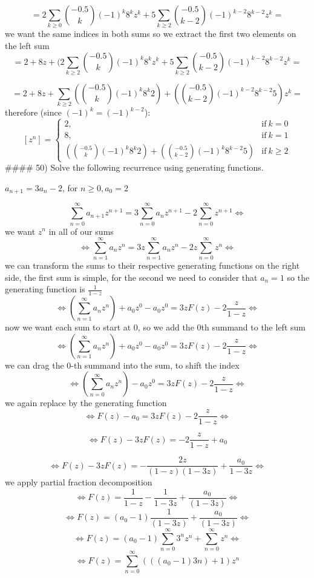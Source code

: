 \documentclass[
]{article}
\begin{document}
\[
= 2 \sum_{k\geq 0} \binom{-0.5}{k} (-1)^k 8^k z^k + 5 \sum_{k\geq 2} \binom{-0.5}{k-2} (-1)^{k-2} 8^{k-2} z^{k} =
\] we want the same indices in both sums so we extract the first two
elements on the left sum \[
= 2 + 8z + (2 \sum_{k\geq 2} \binom{-0.5}{k} (-1)^k 8^k z^k + 5 \sum_{k\geq 2} \binom{-0.5}{k-2} (-1)^{k-2} 8^{k-2} z^{k}  =
\]

\[
= 2 + 8z + \sum_{k\geq 2} \left(\binom{-0.5}{k} (-1)^k 8^k 2 \right) + \left( \binom{-0.5}{k-2} (-1)^{k-2} 8^{k-2} 5 \right) z^{k}  =
\] therefore (since \((-1)^k = (-1)^{k-2}\)): \[
[z^n]= \begin{cases}
      2, & \text{if}\ k=0 \\
      8, & \text{if}\ k=1 \\
      \left(\binom{-0.5}{k} (-1)^k 8^k 2 \right) + \left( \binom{-0.5}{k-2} (-1)^{k} 8^{k-2} 5 \right)  &  \text{if}\ k \geq 2
\end{cases}
\] \#\#\#\# 50) Solve the following recurrence using generating
functions.

\(a_{n+1} = 3 a_n -2\), for \(n \geq 0, a_0 = 2\)

\[
\sum_{n=0}^{\infty} a_{n+1} z^{n+1} = 3 \sum_{n=0}^{\infty} a_{n} z^{n+1} - 2 \sum_{n=0}^{\infty} z^{n+1} \Leftrightarrow
\] we want \(z^n\) in all of our sums \[
\Leftrightarrow \sum_{n=1}^{\infty} a_{n} z^{n} = 3z \sum_{n=1}^{\infty} a_{n} z^{n} - 2z \sum_{n=0}^{\infty} z^{n} \Leftrightarrow
\] we can transform the sums to their respective generating functions on
the right side, the first sum is simple, for the second we need to
consider that \(a_n = 1\) so the generating function is
\(\frac{1}{1-z}\) \[
\Leftrightarrow (\sum_{n=1}^{\infty} a_{n} z^{n}) + a_0z^0 - a_0z^0 = 3z F(z) - 2 \frac{z}{1-z} \Leftrightarrow
\] now we want each sum to start at \(0\), so we add the \(0\)th summand
to the left sum \[
\Leftrightarrow (\sum_{n=1}^{\infty} a_{n} z^{n}) + a_0z^0 - a_0z^0 = 3z F(z) - 2 \frac{z}{1-z} \Leftrightarrow
\] we can drag the \(0\)-th summand into the sum, to shift the index \[
\Leftrightarrow (\sum_{n=0}^{\infty} a_{n} z^{n}) - a_0z^0 = 3z F(z) - 2 \frac{z}{1-z} \Leftrightarrow
\] we again replace by the generating function \[
\Leftrightarrow F(z) - a_0 = 3z F(z) - 2 \frac{z}{1-z} \Leftrightarrow  \]

\[
\Leftrightarrow F(z) - 3z F(z) =  - 2 \frac{z}{1-z} + a_0 
\]

\[
\Leftrightarrow F(z) - 3z F(z) = - \frac{2z}{(1-z)(1-3z)} + \frac{a_0}{1-3z} \Leftrightarrow
\] we apply partial fraction decomposition \[
\Leftrightarrow F(z) =  \frac{1}{1-z} - \frac{1}{1-3z} + \frac{a_0}{(1-3z)} \Leftrightarrow
\] \[
\Leftrightarrow F(z) =  (a_0  - 1) \frac{1}{(1-3z)} + \frac{a_0}{(1-3z)} \Leftrightarrow
\] \[
\Leftrightarrow F(z) =  (a_0  - 1) \sum_{n=0}^{\infty} 3^n z^n + \sum_{n=0}^{\infty} z^n \Leftrightarrow
\] \[
\Leftrightarrow F(z) = \sum_{n=0}^{\infty} (((a_0  - 1)3n)+1) z^n
\]
\end{document}
